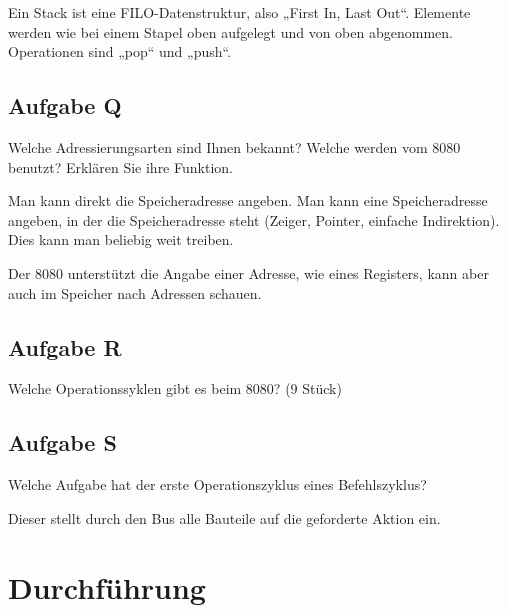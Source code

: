 Ein Stack ist eine FILO-Datenstruktur, also „First In, Last Out“. Elemente
werden wie bei einem Stapel oben aufgelegt und von oben abgenommen. Operationen
sind „pop“ und „push“.

\subsection{Aufgabe Q}

\begin{problem}
	Welche Adressierungsarten sind Ihnen bekannt? Welche werden vom 8080
	benutzt? Erklären Sie ihre Funktion.
\end{problem}

Man kann direkt die Speicheradresse angeben. Man kann eine Speicheradresse
angeben, in der die Speicheradresse steht (Zeiger, Pointer, einfache
Indirektion). Dies kann man beliebig weit treiben.

Der 8080 unterstützt die Angabe einer Adresse, wie eines Registers, kann aber
auch im Speicher nach Adressen schauen.

\subsection{Aufgabe R}

\begin{problem}
	Welche Operationssyklen gibt es beim 8080? (9 Stück)
\end{problem}

\fehlt

\subsection{Aufgabe S}

\begin{problem}
	Welche Aufgabe hat der erste Operationszyklus eines Befehlszyklus?
\end{problem}

Dieser stellt durch den Bus alle Bauteile auf die geforderte Aktion ein.


\section{Durchführung}

